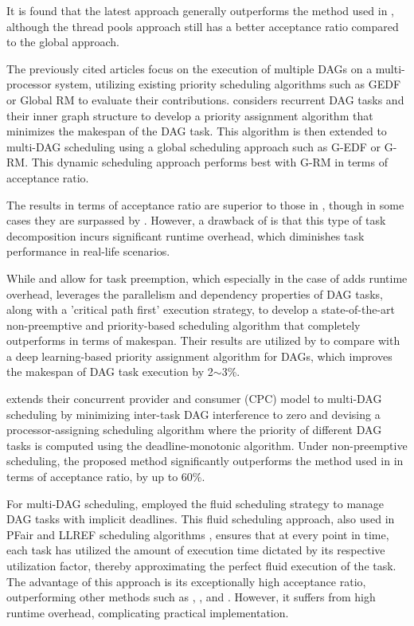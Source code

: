 It is found that the latest approach generally outperforms 
the method used in \cite{SchmidResponseDAGThreadpools2021}, although the 
thread pools approach still has a better acceptance ratio compared 
to the global approach.

The previously cited articles focus on the execution of multiple 
DAGs on a multi-processor system, utilizing existing priority 
scheduling algorithms such as GEDF or Global RM to evaluate their 
contributions. \cite{he2019intra} considers recurrent DAG tasks 
and their inner graph structure to develop a priority assignment 
algorithm that minimizes the makespan of the DAG task. This 
algorithm is then extended to multi-DAG scheduling using a global 
scheduling approach such as G-EDF or G-RM. This dynamic scheduling 
approach performs best with G-RM in terms of acceptance ratio.

The results in terms of acceptance ratio are superior to those in 
\cite{SchmidResponseDAGThreadpools2021}, though in some cases they 
are surpassed by \cite{CaoStretchingDAGs2020}. However, a 
drawback of \cite{CaoStretchingDAGs2020} is that this type of task 
decomposition incurs significant runtime overhead, which diminishes 
task performance in real-life scenarios.

While \cite{he2019intra} and \cite{CaoStretchingDAGs2020} allow 
for task preemption, which especially in the case of 
\cite{CaoStretchingDAGs2020} adds runtime overhead, 
\cite{zhao2020dag} leverages the parallelism and dependency 
properties of DAG tasks, along with a 'critical path first' 
execution strategy, to develop a state-of-the-art non-preemptive 
and priority-based scheduling algorithm that completely outperforms 
\cite{he2019intra} in terms of makespan. Their results are utilized 
by \cite{lee2021DAGDeeplearning} to compare with a deep 
learning-based priority assignment algorithm for DAGs, which 
improves the makespan of DAG task execution by 2$\sim$3\%.

\cite{zhao2022dag} extends their concurrent provider and consumer 
(CPC) model \cite{zhao2020dag} to multi-DAG scheduling by 
minimizing inter-task DAG interference to zero and devising a 
processor-assigning scheduling algorithm where the priority of 
different DAG tasks is computed using the deadline-monotonic 
algorithm. Under non-preemptive scheduling, the proposed method 
significantly outperforms the method used in \cite{he2019intra} in 
terms of acceptance ratio, by up to 60\%.

For multi-DAG scheduling, \cite{GuanDAGfluid2021} employed the 
fluid scheduling strategy to manage DAG tasks with implicit 
deadlines. This fluid scheduling approach, also used in PFair and 
LLREF scheduling algorithms \cite{baruah1993PFair}\cite{cho2006LLREF}, 
ensures that at every point in time, each task has utilized the 
amount of execution time dictated by its respective utilization 
factor, thereby approximating the perfect fluid execution of the 
task. The advantage of this approach is its exceptionally high 
acceptance ratio, outperforming other methods such as 
\cite{WangGEDFDag2019}, \cite{he2019intra}, and \cite{CaoStretchingDAGs2020}. 
However, it suffers from high runtime overhead, complicating 
practical implementation.
\newline

